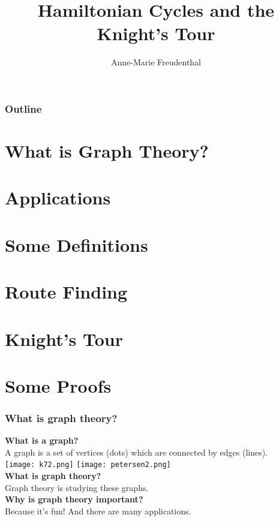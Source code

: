 \documentclass{beamer}
\title{Hamiltonian Cycles and the Knight's Tour}
\author{Anne-Marie Freudenthal}
\date{}
\begin{document}
\begin{frame}
\titlepage
\end{frame}

\begin{frame}
\frametitle{Outline}
\tableofcontents[pausesections]
\end{frame}

\section{What is Graph Theory?}
\section{Applications}
\section{Some Definitions}
\section{Route Finding}
\section{Knight's Tour}
\section{Some Proofs}

\begin{frame}
\frametitle{What is graph theory?} 
\textbf{What is a graph?} \\
\pause
A graph is a set of vertices (dots) which are connected by edges (lines). \\
\hspace{10mm}
\texttt{[image: k72.png]} \hspace{5mm}
\texttt{[image: petersen2.png]} \\
\pause
\textbf{What is graph theory?} \\
\pause
Graph theory is studying these graphs. \\
\pause
\textbf{Why is graph theory important?} \\
\pause
Because it's fun!  And there are many applications. \\
\end{frame}
\end{document}
